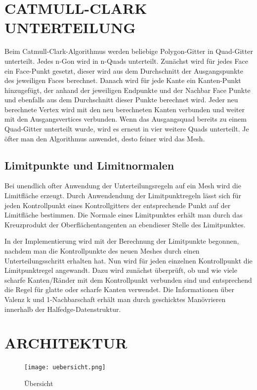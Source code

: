 	\section{\Large CATMULL-CLARK UNTERTEILUNG}
	Beim Catmull-Clark-Algorithmus werden beliebige Polygon-Gitter in Quad-Gitter unterteilt. Jedes n-Gon wird in n-Quads unterteilt. Zunächst wird für jedes Face ein Face-Punkt gesetzt, dieser wird aus dem Durchschnitt der Ausgangspunkte des jeweiligen Faces berechnet. Danach wird für jede Kante ein Kanten-Punkt hinzugefügt, der anhand der jeweiligen Endpunkte und der Nachbar Face Punkte und ebenfalls aus dem Durchschnitt dieser Punkte berechnet wird. Jeder neu berechnete Vertex wird mit den neu berechneten Kanten verbunden und weiter mit den Ausgangsvertices verbunden. Wenn das Ausgangsquad bereits zu einem Quad-Gitter unterteilt wurde, wird es erneut in vier weitere Quads unterteilt. Je öfter man den Algorithmus anwendet, desto feiner wird das Mesh.

\subsection{Limitpunkte und Limitnormalen}
Bei unendlich ofter Anwendung der Unterteilungsregeln auf ein Mesh wird die Limitfläche erzeugt. Durch Anwendendung der Limitpunktregeln lässt sich für jeden Kontrollpunkt eines Kontrollgitters der entsprechende Punkt auf der Limitfläche bestimmen. Die Normale eines Limitpunktes erhält man durch das Kreuzprodukt der Oberflächentangenten an ebendieser Stelle des Limitpunktes.\par In der Implementierung wird mit der Berechnung der Limitpunkte begonnen, nachdem man die Kontrollpunkte des neuen Meshes durch einen Unterteilungsschritt erhalten hat. Nun wird für jeden einzelnen Kontrollpunkt die Limitpunktregel angewandt. Dazu wird zunächst überprüft, ob und wie viele scharfe Kanten/Ränder mit dem Kontrollpunkt verbunden sind und entsprechend die Regel für glatte oder scharfe Kanten verwendet. Die Informationen über Valenz k und 1-Nachbarschaft erhält man durch geschicktes Manövrieren innerhalb der Halfedge-Datenstruktur.


	\section{\Large ARCHITEKTUR}
	
	\begin{figure}[H]
	\centering
	\texttt{[image: uebersicht.png]}
	\caption{Übersicht}
	\label{fig1}
	\end{figure}

